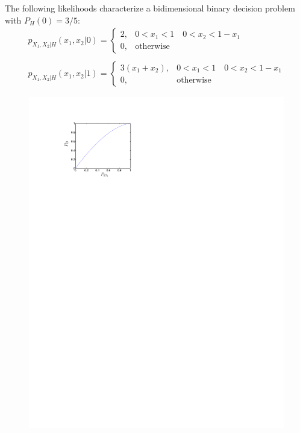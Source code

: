 \question The following likelihoods characterize a bidimensional binary decision problem with $P_H(0)=3/5$:
$$	\begin{array}{l}
					  p_{X_1,X_2|H}(x_1,x_2|0) = \left\lbrace   \begin{array}{ll} 
					  2, & 0<x_1<1 \quad 0<x_2<1-x_1 \\
					  0, & \mbox{otherwise}					  
					   \end{array}\right.  \\ 
					   \; \\
					  p_{X_1,X_2|H}(x_1,x_2|1) = \left\lbrace   \begin{array}{ll} 
					  3\left( x_1+x_2\right) , & 0<x_1<1 \quad 0<x_2<1-x_1 \\
					  0, & \mbox{otherwise}					  
					   \end{array}\right.  			
					  \end{array}	  $$
 
\begin{figure}[h]
\begin{center}
\includegraphics[width=14.5cm, trim=0cm 21.5cm 7cm 2cm]{Figuras/ROC}
\end{center}
\end{figure}

